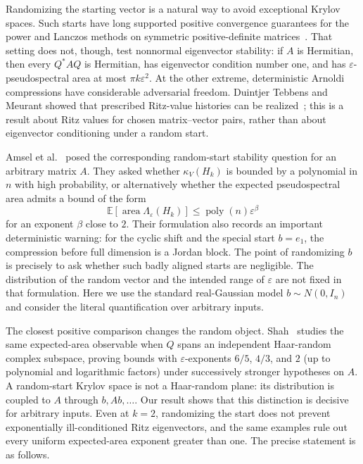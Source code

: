 \documentclass[11pt]{article}
\begin{document}
Randomizing the starting vector is a natural way to avoid exceptional Krylov
spaces.  Such starts have long supported positive convergence guarantees for
the power and Lanczos methods on symmetric positive-definite
matrices~\cite{KuczynskiWozniakowski1992RandomStart}.  That setting does not,
though, test nonnormal eigenvector stability: if $A$ is Hermitian, then every
$Q^*AQ$ is Hermitian, has eigenvector condition number one, and has
$\varepsilon$-pseudospectral area at most $\pi k\varepsilon^2$.  At the other
extreme, deterministic Arnoldi compressions have considerable adversarial
freedom.  Duintjer Tebbens and Meurant showed that prescribed Ritz-value
histories can be realized~\cite{DuintjerTebbensMeurant2012AnyRitz}; this is a
result about Ritz values for chosen matrix--vector pairs, rather than about
eigenvector conditioning under a random start.

Amsel et al.~\cite{AmselEtAl2026LinearSystems} posed the corresponding
random-start stability question for an arbitrary matrix $A$.  They asked
whether $\kappa_V(H_k)$ is bounded by a polynomial in $n$ with high
probability, or alternatively whether the expected pseudospectral area admits
a bound of the form
\[
  \mathbb E\!\left[\operatorname{area}\Lambda_\varepsilon(H_k)\right]
  \leq \operatorname{poly}(n)\varepsilon^\beta
\]
for an exponent $\beta$ close to $2$.  Their formulation also records an
important deterministic warning: for the cyclic shift and the special start
$b=e_1$, the compression before full dimension is a Jordan block.  The point
of randomizing $b$ is precisely to ask whether such badly aligned starts are
negligible.  The distribution of the random vector and the intended range of
$\varepsilon$ are not fixed in that formulation.  Here we use the standard
real-Gaussian model $b\sim N(0,I_n)$ and consider the literal quantification
over arbitrary inputs.

The closest positive comparison changes the random object.
Shah~\cite{Shah2025RandomCompressions} studies the same expected-area observable
when $Q$ spans an independent Haar-random complex subspace, proving bounds
with $\varepsilon$-exponents $6/5$, $4/3$, and $2$ (up to polynomial and
logarithmic factors) under successively stronger hypotheses on $A$.  A
random-start Krylov space is not a Haar-random plane: its distribution is
coupled to $A$ through $b,Ab,\ldots$.  Our result shows that this distinction
is decisive for arbitrary inputs.  Even at $k=2$, randomizing the start does
not prevent exponentially ill-conditioned Ritz eigenvectors, and the same
examples rule out every uniform expected-area exponent greater than one.
The precise statement is as follows.
\end{document}

